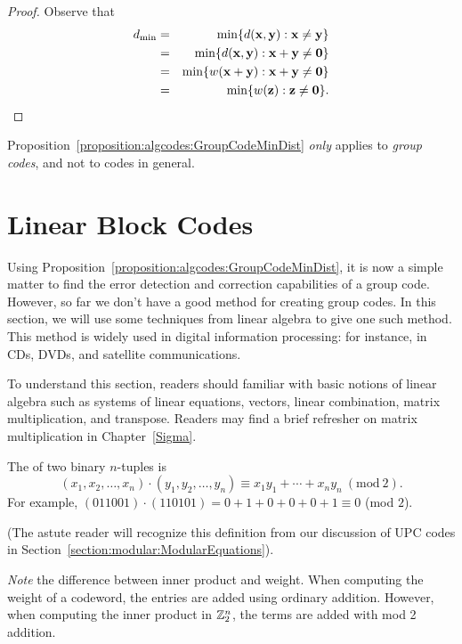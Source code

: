 \begin{proof}
Observe that
\begin{eqnarray*}
d_{\min} &= & \min \{ d({\bold x},{\bold y}) : {\bold x}
\neq
{\bold y} \} \\
&= & \min \{ d({\bold x},{\bold y}) : {\bold x}+{\bold y}
\neq {\bold 0} \} \\
&=& \min\{ w({\bold x} + {\bold y}) : {\bold x}+{\bold y}
\neq {\bold 0} \} \\
& = & \min\{ w({\bold z}) : {\bold z} \neq {\bold 0} \}.
\end{eqnarray*}
\end{proof}
 
 \begin{warn}
 Proposition~\ref{proposition:algcodes:GroupCodeMinDist}  \emph{only} applies to \emph{group codes}, and not to codes in general.
 \end{warn}
 
\section{Linear Block Codes \label{section:algcodes:BlockCodes}}
  
Using Proposition~\ref{proposition:algcodes:GroupCodeMinDist}, it is now a simple matter to find the error detection and correction capabilities of a group code. However, so far we don't have a good method  for creating group codes. In this section, we will use some techniques from linear algebra to give one such method. This method is widely used in digital information processing: for instance, in CDs, DVDs, and satellite communications.

To understand this section, readers should familiar with basic notions of linear algebra such as systems of linear equations, vectors, linear combination, matrix multiplication, and transpose. Readers may find a brief refresher on matrix multiplication in Chapter~\ref{Sigma}.
 
 \begin{defn}
The  of two binary
$n$-tuples is
\[
(x_1, x_2, \ldots, x_n) \cdot (y_1, y_2, \ldots, y_n) \equiv x_1 y_1 + \cdots + x_n y_n ~(\mathrm{mod~}2).
\]
For example, $(011001) \cdot (110101) = 0+1+0+0+0+1 \equiv 0$ (mod $2$). 

\noindent
(The astute reader will recognize this definition from our discussion of UPC codes in Section~\ref{section:modular:ModularEquations}).
\end{defn}
\emph{Note} the difference between inner product and weight. When computing the weight of a codeword, the entries are added using ordinary addition. However, when computing the inner product  in ${\Bbb Z_2^n}$, the terms are added  with mod 2 addition.

